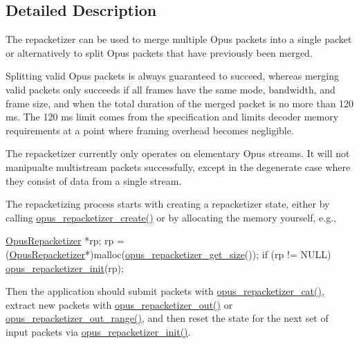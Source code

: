 \subsection{Detailed Description}
The repacketizer can be used to merge multiple Opus packets into a single packet or alternatively to split Opus packets that have previously been merged. 

Splitting valid Opus packets is always guaranteed to succeed, whereas merging valid packets only succeeds if all frames have the same mode, bandwidth, and frame size, and when the total duration of the merged packet is no more than 120 ms. The 120 ms limit comes from the specification and limits decoder memory requirements at a point where framing overhead becomes negligible.

The repacketizer currently only operates on elementary Opus streams. It will not manipualte multistream packets successfully, except in the degenerate case where they consist of data from a single stream.

The repacketizing process starts with creating a repacketizer state, either by calling \hyperlink{group__opus__repacketizer_ga6f8813666ef851550ecf8658a731ff7d}{opus\+\_\+repacketizer\+\_\+create()} or by allocating the memory yourself, e.\+g., 
\begin{DoxyCode}
\hyperlink{group__opus__repacketizer_ga1f85070a64bcbf5bf24f5ccb80323e7b}{OpusRepacketizer} *rp;
rp = (\hyperlink{group__opus__repacketizer_ga1f85070a64bcbf5bf24f5ccb80323e7b}{OpusRepacketizer}*)malloc(\hyperlink{group__opus__repacketizer_ga35c8fc05764748d187c62fc50e812d06}{opus\_repacketizer\_get\_size}());
\textcolor{keywordflow}{if} (rp != NULL)
    \hyperlink{group__opus__repacketizer_gab42ff7c3f8a49ff5029fcf60f3b853f0}{opus\_repacketizer\_init}(rp);
\end{DoxyCode}


Then the application should submit packets with \hyperlink{group__opus__repacketizer_ga2840dd56bfa37f8c6874355b9ce8fb46}{opus\+\_\+repacketizer\+\_\+cat()}, extract new packets with \hyperlink{group__opus__repacketizer_ga19ff1e91a8fa652380f972a224a26481}{opus\+\_\+repacketizer\+\_\+out()} or \hyperlink{group__opus__repacketizer_gac591b550d92125b4abfa11a4b609f51f}{opus\+\_\+repacketizer\+\_\+out\+\_\+range()}, and then reset the state for the next set of input packets via \hyperlink{group__opus__repacketizer_gab42ff7c3f8a49ff5029fcf60f3b853f0}{opus\+\_\+repacketizer\+\_\+init()}.

